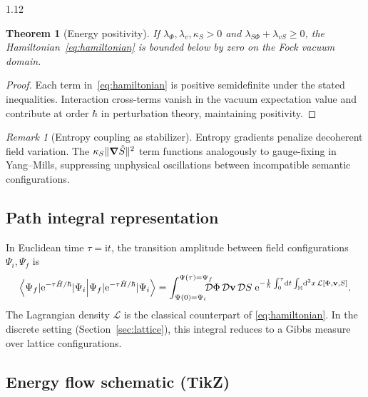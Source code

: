 \documentclass[12pt,a4paper]{article}
\numberwithin{equation}{section}
\newtheorem{theorem}{Theorem}[section]
\theoremstyle{remark}
\newtheorem{remark}{Remark}[section]
\theoremstyle{definition}
\newcommand{\M}{\mathbb{M}}
\newcommand{\ii}{\mathrm{i}}
\newcommand{\ee}{\mathrm{e}}
\begin{document}
\begin{spacing}{1.12}
\begin{theorem}[Energy positivity]
\label{thm:energy-positive}
If $\lambda_\Phi,\lambda_v,\kappa_S>0$ and $\lambda_{S\Phi}+\lambda_{vS}\ge0$, the Hamiltonian~\eqref{eq:hamiltonian} is bounded below by zero on the Fock vacuum domain.
\end{theorem}

\begin{proof}
Each term in~\eqref{eq:hamiltonian} is positive semidefinite under the stated inequalities.  Interaction cross-terms vanish in the vacuum expectation value and contribute at order $\hbar$ in perturbation theory, maintaining positivity.
\end{proof}

\begin{remark}[Entropy coupling as stabilizer]
Entropy gradients penalize decoherent field variation.  The $\kappa_S\|\grad\hat{S}\|^2$ term functions analogously to gauge-fixing in Yang–Mills, suppressing unphysical oscillations between incompatible semantic configurations.
\end{remark}

\subsection{Path integral representation}
\label{subsec:path-integral}

In Euclidean time $\tau=\ii t$, the transition amplitude between field configurations $\Psi_i,\Psi_f$ is
\[
\braket{\Psi_f|\ee^{-\tau \hat{H}/\hbar}|\Psi_i}
=\int_{\Psi(0)=\Psi_i}^{\Psi(\tau)=\Psi_f}
\!\!\!\!\!\!\mathcal{D}\Phi\,\mathcal{D}\mathbf{v}\,\mathcal{D}S\;
\ee^{-\frac{1}{\hbar}\int_0^\tau\!\dd t\int_{\M}\!\dd^3x\,
\mathcal{L}[\Phi,\mathbf{v},S]}.
\]
The Lagrangian density $\mathcal{L}$ is the classical counterpart of \eqref{eq:hamiltonian}.  In the discrete setting (Section~\ref{sec:lattice}), this integral reduces to a Gibbs measure over lattice configurations.

\subsection{Energy flow schematic (TikZ)}
\label{subsec:energy-flow}

\begin{figure}[H]
\centering
{}
\end{figure}
\end{spacing}
\end{document}
